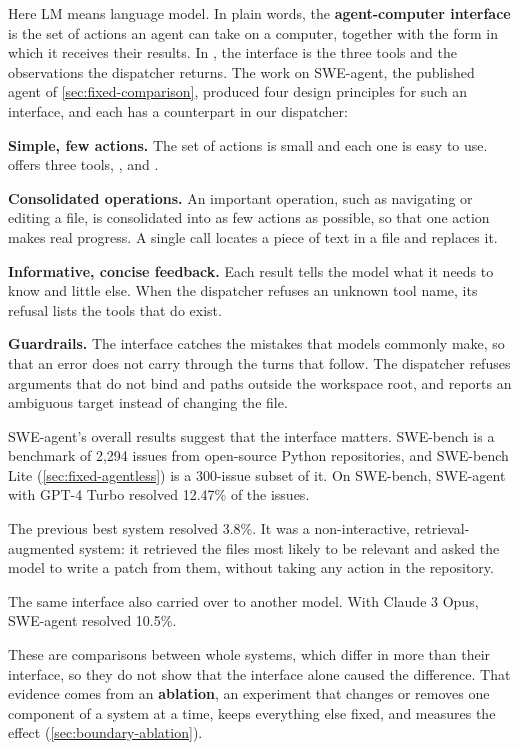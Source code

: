 Here LM means language model. In plain words, the \textbf{agent-computer interface} is the set of
actions an agent can take on a computer, together with the form in which it receives their results.
In \msa{}, the interface is the three tools and the observations the dispatcher returns. The work on
SWE-agent, the published agent of \cref{sec:fixed-comparison}, produced four design principles for
such an interface, and each has a counterpart in our dispatcher:
\bi
\item \textbf{Simple, few actions.} The set of actions is small and each one is easy to use. \msa{}
offers three tools, ,  and .
\item \textbf{Consolidated operations.} An important operation, such as navigating or editing a
file, is consolidated into as few actions as possible, so that one action makes real progress. A single  call locates a piece of text in a file and
replaces it.
\item \textbf{Informative, concise feedback.} Each result tells the model what it needs to know and
little else. When the dispatcher refuses an unknown tool name, its refusal lists the tools that do
exist.
\item \textbf{Guardrails.} The interface catches the mistakes that models commonly make, so that an
error does not carry through the turns that follow. The dispatcher refuses arguments that do not bind
and paths outside the workspace root, and  reports an ambiguous target instead of
changing the file.
\ei

SWE-agent's overall results suggest that the interface matters. SWE-bench is a benchmark of 2,294
issues from open-source Python repositories, and SWE-bench Lite (\cref{sec:fixed-agentless}) is a
300-issue subset of it. On SWE-bench, SWE-agent with GPT-4 Turbo resolved 12.47\% of the issues.

The previous best system resolved 3.8\%. It was a non-interactive, retrieval-augmented system: it
retrieved the files most likely to be relevant and asked the model to write a patch from them,
without taking any action in the repository.

The same interface also carried over to another model. With Claude 3 Opus, SWE-agent resolved
10.5\%.

These are comparisons between whole systems, which differ in more than their interface, so they do
not show that the interface alone caused the difference. That evidence comes from an
\textbf{ablation}, an experiment that changes or removes one component of a system at a time, keeps
everything else fixed, and measures the effect (\cref{sec:boundary-ablation}).

